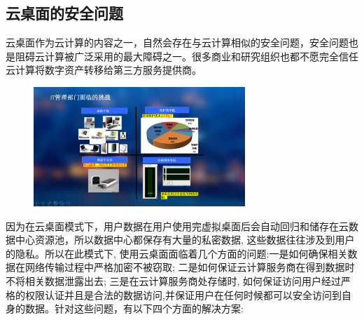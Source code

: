 \documentclass{article}
\begin{document}
\subsection{云桌面的安全问题}\par
云桌面作为云计算的内容之一，自然会存在与云计算相似的安全问题，安全问题也是阻碍云计算被广泛采用的最大障碍之一。很多商业和研究组织也都不愿完全信任云计算将数字资产转移给第三方服务提供商。\citep{bb}
    \begin{figure}[H]
	\centering
	\includegraphics[width=8cm]{333.png}
	\label{figupc}
	
\end{figure}
因为在云桌面模式下，用户数据在用户使用完虚拟桌面后会自动回归和储存在云数据中心资源池，所以数据中心都保存有大量的私密数据, 这些数据往往涉及到用户的隐私。所以在此模式下, 使用云桌面面临着几个方面的问题:一是如何确保相关数据在网络传输过程中严格加密不被窃取; 二是如何保证云计算服务商在得到数据时不将相关数据泄露出去; 三是在云计算服务商处存储时, 如何保证访问用户经过严格的权限认证并且是合法的数据访问,并保证用户在任何时候都可以安全访问到自身的数据。针对这些问题，有以下四个方面的解决方案:
\end{document}
